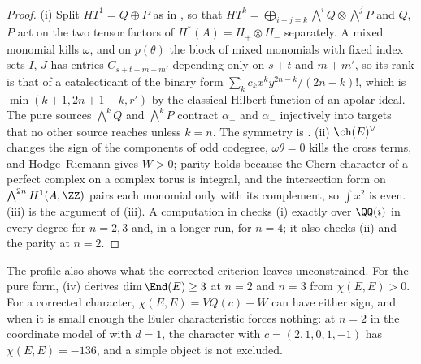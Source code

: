 \begin{proof}
(i) Split $HT^{1}=Q\oplus P$ as in , so that
$HT^{k}=\bigoplus_{i+j=k}\bigwedge^{i}Q\otimes\bigwedge^{j}P$ and $Q$, $P$ act
on the two tensor factors of $H^{*}(A)=H_{+}\otimes H_{-}$ separately. A mixed
monomial kills $\omega$, and on $p(\theta)$ the block of mixed monomials with
fixed index sets $I$, $J$ has entries $C_{s+t+m+m'}$ depending only on
$s+t$ and $m+m'$, so its rank is that of a catalecticant of the binary form
$\sum_{k}c_{k}x^{k}y^{2n-k}/(2n-k)!$, which is $\min(k+1,2n+1-k,r')$ by the
classical Hilbert function of an apolar ideal. The pure sources
$\bigwedge^{k}Q$ and $\bigwedge^{k}P$ contract $\alpha_{+}$ and $\alpha_{-}$
injectively into targets that no other source reaches unless $k=n$. The
symmetry is . (ii) $\ch(E)^{\vee}$ changes the sign of
the components of odd codegree, $\omega\theta=0$ kills the cross terms, and
Hodge--Riemann gives $W>0$; parity holds because the Chern character of a
perfect complex on a complex torus is integral, and the intersection form on
$\bigwedge^{2n}H^{1}(A,\ZZ)$ pairs each monomial only with its complement, so
$\int x^{2}$ is even. (iii) is the argument of (iii).
A computation in \cite{BMB26} checks (i) exactly over $\QQ(i)$ in
every degree for $n=2,3$ and, in a longer run, for $n=4$; it also checks (ii)
and the parity at $n=2$.
\end{proof}

The profile also shows what the corrected criterion leaves unconstrained. For
the pure form, (iv) derives $\dim\End(E)\ge3$ at $n=2$ and
$n=3$ from $\chi(E,E)>0$. For a corrected character, $\chi(E,E)=VQ(c)+W$ can
have either sign, and when it is small enough the Euler characteristic forces
nothing: at
$n=2$ in the coordinate model of \cite{BMB26} with
$d=1$, the character with
$c=(2,1,0,1,-1)$ has $\chi(E,E)=-136$, and a simple object is not excluded.

